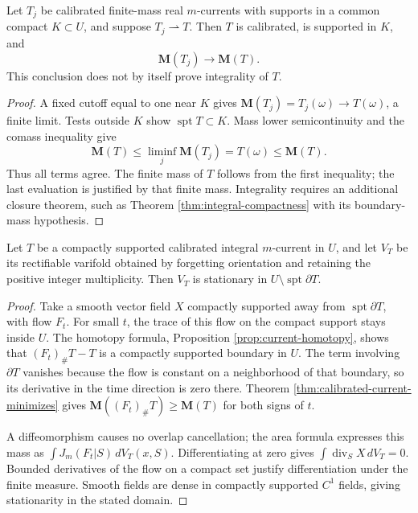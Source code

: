 \begin{proposition}\label{prop:calibrated-weak-limits}
Let $T_j$ be calibrated finite-mass real $m$-currents with supports in a common compact $K\subset U$, and suppose $T_j\rightharpoonup T$. Then $T$ is calibrated, is supported in $K$, and
\[
 \mathbf M(T_j)\longrightarrow\mathbf M(T).
\]
This conclusion does not by itself prove integrality of $T$.
\end{proposition}
\begin{proof}
A fixed cutoff equal to one near $K$ gives
$\mathbf M(T_j)=T_j(\omega)\to T(\omega)$, a finite limit. Tests outside $K$ show $\operatorname{spt}T\subset K$. Mass lower semicontinuity and the comass inequality give
\[
 \mathbf M(T)\leq\liminf_j\mathbf M(T_j)=T(\omega)\leq\mathbf M(T).
\]
Thus all terms agree. The finite mass of $T$ follows from the first inequality; the last evaluation is justified by that finite mass. Integrality requires an additional closure theorem, such as Theorem \ref{thm:integral-compactness} with its boundary-mass hypothesis.
\end{proof}

\begin{proposition}\label{prop:calibrated-current-stationary}
Let $T$ be a compactly supported calibrated integral $m$-current in $U$, and let $V_T$ be its rectifiable varifold obtained by forgetting orientation and retaining the positive integer multiplicity. Then $V_T$ is stationary in $U\setminus\operatorname{spt}\partial T$.
\end{proposition}
\begin{proof}
Take a smooth vector field $X$ compactly supported away from $\operatorname{spt}\partial T$, with flow $F_t$. For small $t$, the trace of this flow on the compact support stays inside $U$. The homotopy formula, Proposition \ref{prop:current-homotopy}, shows that $(F_t)_\#T-T$ is a compactly supported boundary in $U$. The term involving $\partial T$ vanishes because the flow is constant on a neighborhood of that boundary, so its derivative in the time direction is zero there. Theorem \ref{thm:calibrated-current-minimizes} gives $\mathbf M((F_t)_\#T)\geq\mathbf M(T)$ for both signs of $t$.

A diffeomorphism causes no overlap cancellation; the area formula expresses this mass as $\int J_m(F_t|S)\,dV_T(x,S)$. Differentiating at zero gives $\int\operatorname{div}_S X\,dV_T=0$. Bounded derivatives of the flow on a compact set justify differentiation under the finite measure. Smooth fields are dense in compactly supported $C^1$ fields, giving stationarity in the stated domain.
\end{proof}

